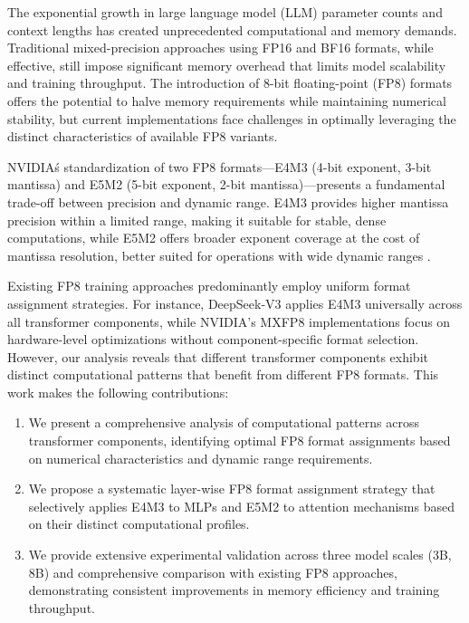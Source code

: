 \documentclass[conference]{IEEEtran}
\begin{document}
The exponential growth in large language model (LLM) parameter counts and context lengths has created unprecedented computational and memory demands. Traditional mixed-precision approaches using FP16 and BF16 formats, while effective, still impose significant memory overhead that limits model scalability and training throughput. The introduction of 8-bit floating-point (FP8) formats \cite{micikevicius2022fp8formatsdeeplearning} offers the potential to halve memory requirements while maintaining numerical stability, but current implementations face challenges in optimally leveraging the distinct characteristics of available FP8 variants.

NVIDIA\'s standardization of two FP8 formats—E4M3 (4-bit exponent, 3-bit mantissa) and E5M2 (5-bit exponent, 2-bit mantissa)—presents a fundamental trade-off between precision and dynamic range. E4M3 provides higher mantissa precision within a limited range, making it suitable for stable, dense computations, while E5M2 offers broader exponent coverage at the cost of mantissa resolution, better suited for operations with wide dynamic ranges \cite{nvidia2022fp8}.

Existing FP8 training approaches predominantly employ uniform format assignment strategies. For instance, DeepSeek-V3 \cite{deepseekv3} applies E4M3 universally across all transformer components, while NVIDIA's MXFP8 implementations \cite{nvidia2024mxfp8} focus on hardware-level optimizations without component-specific format selection. However, our analysis reveals that different transformer components exhibit distinct computational patterns that benefit from different FP8 formats.
This work makes the following contributions:

\begin{enumerate}
\item We present a comprehensive analysis of computational patterns across transformer components, identifying optimal FP8 format assignments based on numerical characteristics and dynamic range requirements.

\item We propose a systematic layer-wise FP8 format assignment strategy that selectively applies E4M3 to MLPs and E5M2 to attention mechanisms based on their distinct computational profiles.

\item We provide extensive experimental validation across three model scales (3B, 8B) and comprehensive comparison with existing FP8 approaches, demonstrating consistent improvements in memory efficiency and training throughput.

\end{enumerate}
\end{document}
